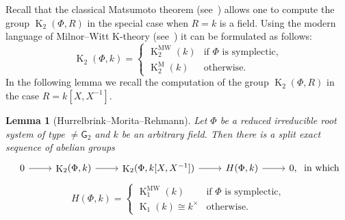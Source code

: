 \documentclass[10pt,a4paper,twoside]{article}
\newtheorem{lemma}{Lemma}
\theoremstyle{remark}
\theoremstyle{definition}
\numberwithin{lemma}{section}
\numberwithin{prop}{section}
\numberwithin{corollary}{section}
\numberwithin{externaltheorem}{section}
\DeclareMathOperator{\K}{K}
\newcommand{\inv}{^{-1}}
\newcommand{\rG}{\mathsf{G}}
\numberwithin{equation}{section}
\begin{document}
Recall that the classical Matsumoto theorem (see~\cite[Theorem~5.10]{Ma69}) allows one to compute the group $\K_2(\Phi, R)$ in the special case when $R=k$ is a field.
Using the modern language of Milnor--Witt K-theory (see~\cite{Mo04}) it can be formulated as follows:
\begin{equation*} \K_2(\Phi, k) = \left\{\begin{array}{ll} \K_2^\mathrm{MW}(k)& \text{if $\Phi$ is symplectic,}\\ \K_2^\mathrm{M}(k) & \text{otherwise.}\end{array}\right. \end{equation*}
In the following lemma we recall the computation of the group $\K_2(\Phi, R)$ in the case $R=k[X, X\inv]$.
\begin{lemma}[Hurrelbrink--Morita--Rehmann]\label{K2-laurent-field} Let $\Phi$ be a reduced irreducible root system of type $\neq \rG_2$ and $k$ be an arbitrary field. Then there is a split exact sequence of abelian groups
\[\begin{tikzcd} 0 \arrow{r} & \K_2(\Phi, k) \arrow{r} & \K_2(\Phi, k[X, X^{-1}]) \arrow{r} & H(\Phi, k) \arrow{r} & 0, \end{tikzcd}\text{ in which}\]
\[ H(\Phi, k) = \left\{\begin{array}{ll} \K_1^\mathrm{MW}(k)& \text{if $\Phi$ is symplectic,}\\ \K_1(k) \cong k^\times & \text{otherwise.}  \end{array}\right. \]  \end{lemma}
\end{document}
